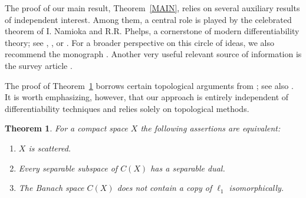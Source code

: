 \documentclass[12pt]{amsart}
\theoremstyle{plain}
\newtheorem{theorem}{Theorem}[section]
\theoremstyle{definition}
\theoremstyle{remark}
\begin{document}
The proof of our main result, Theorem~\ref{MAIN}, relies on several auxiliary results of independent interest. Among them, a central role is played by the celebrated theorem of I. Namioka and R.R. Phelps, a cornerstone of modern differentiability theory; see \cite[Lemma~VI.8.3]{dgz}, \cite[Theorem~14.25]{y2}, or \cite[Theorem~18]{np}. For a broader perspective on this circle of ideas, we also recommend the monograph \cite{f}. Another very useful relevant source of information is the survey article \cite{Yost}.

The proof of Theorem~\ref{1} borrows certain topological arguments from \cite[pp.~626--627]{y2}; see also \cite[Main Theorem]{Pelczynski-Semadeni}. It is worth emphasizing, however, that our approach is entirely independent of differentiability techniques and relies solely on topological methods.
\begin{theorem}\label{1} For a compact space $X$ the following assertions are equivalent:
 \begin{enumerate}
  \item $X$ is scattered.
  \item Every separable subspace of $C(X)$ has a separable dual.
  \item The Banach space $C(X)$ does not contain a copy of $\ell_1$ isomorphically.
 \end{enumerate}
\end{theorem}
\end{document}
